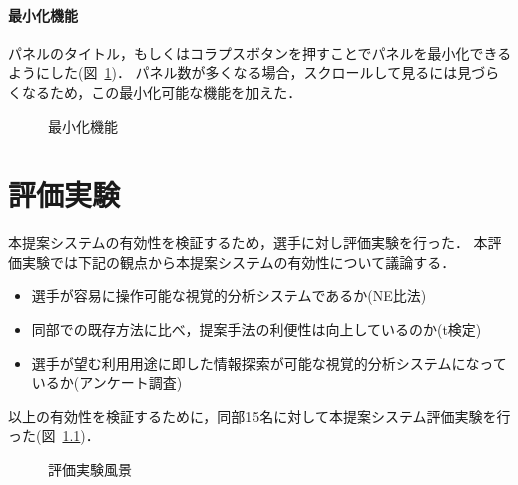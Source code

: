 \documentclass[sotsuron]{kuee}
\begin{document}
			\subsubsection{最小化機能}
				パネルのタイトル，もしくはコラプスボタンを押すことでパネルを最小化できるようにした(図~\ref{fig:collapse})．
				パネル数が多くなる場合，スクロールして見るには見づらくなるため，この最小化可能な機能を加えた．
					\begin{figure}
						\begin{center}
						\end{center}
						\caption{最小化機能}
				  		\label{fig:collapse}
					\end{figure}
\chapter{評価実験}
	本提案システムの有効性を検証するため，選手に対し評価実験を行った．
	本評価実験では下記の観点から本提案システムの有効性について議論する．
	\begin{itemize}
		\item 選手が容易に操作可能な視覚的分析システムであるか(NE比法)
		\item 同部での既存方法に比べ，提案手法の利便性は向上しているのか(t検定)
		\item 選手が望む利用用途に即した情報探索が可能な視覚的分析システムになっているか(アンケート調査)
	\end{itemize}
	以上の有効性を検証するために，同部15名に対して本提案システム評価実験を行った(図~\ref{fig:experi})．
		\begin{figure}
			\begin{center}
			\end{center}
			\caption{評価実験風景}
	  		\label{fig:experi}
		\end{figure}
\end{document}

